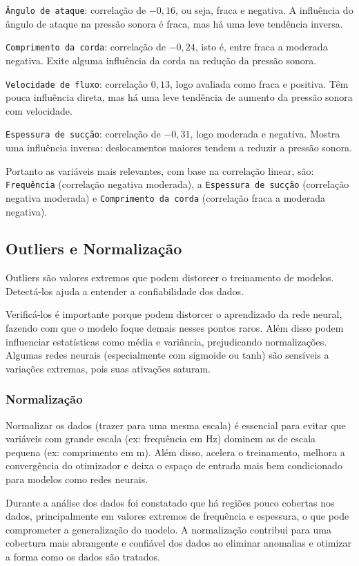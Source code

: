 \documentclass[12pt,a4paper,oneside]{report}
\begin{document}
	\texttt{Ângulo de ataque}: correlação de $-0,16$, ou seja, fraca e negativa. A influência do ângulo de ataque na pressão sonora é fraca, mas há uma leve tendência inversa.
	
	\texttt{Comprimento da corda}: correlação de $-0,24$, isto é, entre fraca a moderada negativa. Exite alguma influência da corda na redução da pressão sonora.
	
	\texttt{Velocidade de fluxo}: correlação $0,13$, logo avaliada como fraca e positiva. Têm pouca influência direta, mas há uma leve tendência de aumento da pressão sonora com velocidade.
	
	\texttt{Espessura de sucção}: correlação de $-0,31$, logo moderada e negativa. Mostra uma influência inversa: deslocamentos maiores tendem a reduzir a pressão sonora.
	
	Portanto as variáveis mais relevantes, com base na correlação linear, são: \texttt{Frequência} (correlação negativa moderada), a \texttt{Espessura de sucção} (correlação negativa moderada) e \texttt{Comprimento da corda} (correlação fraca a moderada negativa).
	
	
	\subsection{Outliers e Normaliza\c{c}\~ao}
	
	Outliers s\~ao valores extremos que podem distorcer o treinamento de modelos. Detectá-los ajuda a entender a confiabilidade dos dados.
	
	Verificá-los é importante porque podem distorcer o aprendizado da rede neural, fazendo com que o modelo foque demais nesses pontos raros. Além disso podem influenciar estatísticas como média e variância, prejudicando normalizações. Algumas redes neurais (especialmente com sigmoide ou tanh) são sensíveis a variações extremas, pois suas ativações saturam.
	
	\subsubsection*{Normalização}
	
	Normalizar os dados (trazer para uma mesma escala) é essencial para evitar que variáveis com grande escala (ex: frequência em Hz) dominem as de escala pequena (ex: comprimento em m). Além disso, acelera o treinamento, melhora a convergência do otimizador e deixa o espaço de entrada mais bem condicionado para modelos como redes neurais.
	
	Durante a análise dos dados foi constatado que há regi\~oes pouco cobertas nos dados, principalmente em valores extremos de frequência e espessura, o que pode comprometer a generaliza\c{c}\~ao do modelo. A normalização contribui para uma cobertura mais abrangente e confiável dos dados ao eliminar anomalias e otimizar a forma como os dados são tratados.
\end{document}

